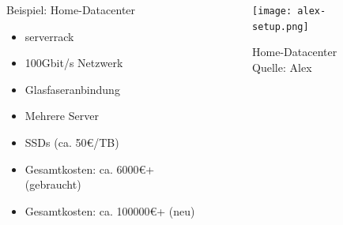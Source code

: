 \documentclass[
    ngerman,
    accentcolor=3b,
    fontsize= 12pt,
    a4paper,
    aspectratio=169,
    colorback=true,
    fancy_row_colors,
    leqno,
    fleqn,
    boxarc=3pt,
    fleqn,
    main,
    design=2008,
]{algoslides}
\begin{document}
    \begin{frame}
        \slidehead{}
        \begin{columns}[T]
            \begin{column}{.5\textwidth}
                Beispiel: Home-Datacenter
                \begin{itemize}
                    \item serverrack
                    \item 100Gbit/s Netzwerk
                    \item Glasfaseranbindung
                    \item Mehrere Server
                    \item SSDs (ca. 50€/TB)
                    \item Gesamtkosten: ca. 6000€+ (gebraucht)
                    \item Gesamtkosten: ca. 100000€+ (neu)
                \end{itemize}
            \end{column}%
            \begin{column}{.5\textwidth}
                \begin{figure}[ht!]
                    \centering
                    \texttt{[image: alex-setup.png]}
                    \caption{Home-Datacenter\\Quelle: Alex}
                    \label{fig:home-datacenter}
                \end{figure}
            \end{column}%
        \end{columns}
    \end{frame}
\end{document}
